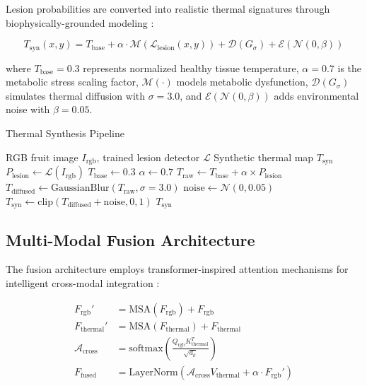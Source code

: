 \documentclass[conference]{IEEEtran}
\begin{document}
Lesion probabilities are converted into realistic thermal signatures through biophysically-grounded modeling \cite{liu2021}:

\begin{equation}
    T_{\text{syn}}(x,y) = T_{\text{base}} + \alpha \cdot \mathcal{M}(\mathcal{L}_{\text{lesion}}(x,y)) + \mathcal{D}(G_{\sigma}) + \mathcal{E}(\mathcal{N}(0,\beta))
    \label{eq:thermal_synthesis}
\end{equation}

where $T_{\text{base}} = 0.3$ represents normalized healthy tissue temperature, $\alpha = 0.7$ is the metabolic stress scaling factor, $\mathcal{M}(\cdot)$ models metabolic dysfunction, $\mathcal{D}(G_{\sigma})$ simulates thermal diffusion with $\sigma = 3.0$, and $\mathcal{E}(\mathcal{N}(0,\beta))$ adds environmental noise with $\beta = 0.05$.

\begin{algorithm}[!t]
    \caption{Thermal Synthesis Pipeline}
    \label{alg:thermal}
    \begin{algorithmic}[1]
        \REQUIRE RGB fruit image $I_{\text{rgb}}$, trained lesion detector $\mathcal{L}$
        \ENSURE Synthetic thermal map $T_{\text{syn}}$
        \STATE $P_{\text{lesion}} \leftarrow \mathcal{L}(I_{\text{rgb}})$
        \STATE $T_{\text{base}} \leftarrow 0.3$
        \STATE $\alpha \leftarrow 0.7$
        \STATE $T_{\text{raw}} \leftarrow T_{\text{base}} + \alpha \times P_{\text{lesion}}$
        \STATE $T_{\text{diffused}} \leftarrow \text{GaussianBlur}(T_{\text{raw}}, \sigma=3.0)$
        \STATE $\text{noise} \leftarrow \mathcal{N}(0, 0.05)$
        \STATE $T_{\text{syn}} \leftarrow \text{clip}(T_{\text{diffused}} + \text{noise}, 0, 1)$
        \RETURN $T_{\text{syn}}$
    \end{algorithmic}
\end{algorithm}

\subsection{Multi-Modal Fusion Architecture}

The fusion architecture employs transformer-inspired attention mechanisms for intelligent cross-modal integration \cite{vaswani2017,devlin2019}:

\begin{align}
    F_{\text{rgb}}' &= \text{MSA}(F_{\text{rgb}}) + F_{\text{rgb}} \label{eq:self_attention_rgb} \\
    F_{\text{thermal}}' &= \text{MSA}(F_{\text{thermal}}) + F_{\text{thermal}} \label{eq:self_attention_thermal} \\
    \mathcal{A}_{\text{cross}} &= \text{softmax}\left(\frac{Q_{\text{rgb}} K_{\text{thermal}}^T}{\sqrt{d_k}}\right) \label{eq:cross_attention} \\
    F_{\text{fused}} &= \text{LayerNorm}(\mathcal{A}_{\text{cross}} V_{\text{thermal}} + \alpha \cdot F_{\text{rgb}}') \label{eq:fusion_output}
\end{align}
\end{document}
